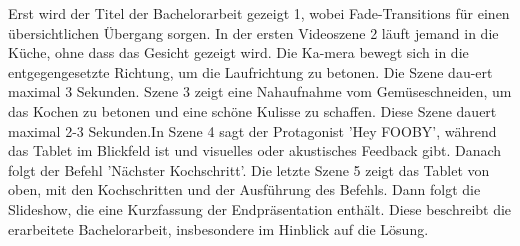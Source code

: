 \documentclass[main.tex]{subfiles} %
\begin{document}
\noindent \newline
Erst wird der Titel der Bachelorarbeit gezeigt 1, wobei Fade-Transitions für einen 
übersichtlichen Übergang sorgen. In der ersten Videoszene 2 läuft jemand in die Küche, ohne 
dass das Gesicht gezeigt wird. Die Ka-mera bewegt sich in die entgegengesetzte Richtung, um die 
Laufrichtung zu betonen. Die Szene dau-ert maximal 3 Sekunden. Szene 3 zeigt eine Nahaufnahme vom 
Gemüseschneiden, um das Kochen zu betonen und eine schöne Kulisse zu schaffen. Diese Szene dauert 
maximal 2-3 Sekunden.In Szene 4 sagt der Protagonist 'Hey FOOBY', während das Tablet im Blickfeld 
ist und visuelles oder akustisches Feedback gibt. Danach folgt der Befehl 'Nächster Kochschritt'. 
Die letzte Szene 5 zeigt das Tablet von oben, mit den Kochschritten und der Ausführung des 
Befehls. Dann folgt die Slideshow, die eine Kurzfassung der Endpräsentation enthält. Diese 
beschreibt die erarbeitete Bachelorarbeit, insbesondere im Hinblick auf die Lösung.
\end{document}
